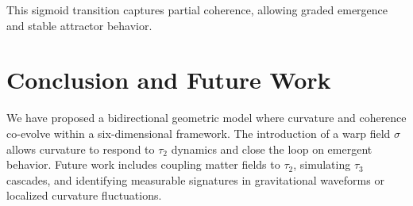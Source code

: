 \documentclass[12pt]{article}
\begin{document}
This sigmoid transition captures partial coherence, allowing graded emergence and stable attractor behavior.

\section{Conclusion and Future Work}
We have proposed a bidirectional geometric model where curvature and coherence co-evolve within a six-dimensional framework. The introduction of a warp field \( \sigma \) allows curvature to respond to \( \tau_2 \) dynamics and close the loop on emergent behavior. Future work includes coupling matter fields to \( \tau_2 \), simulating \( \tau_3 \) cascades, and identifying measurable signatures in gravitational waveforms or localized curvature fluctuations.
\end{document}
